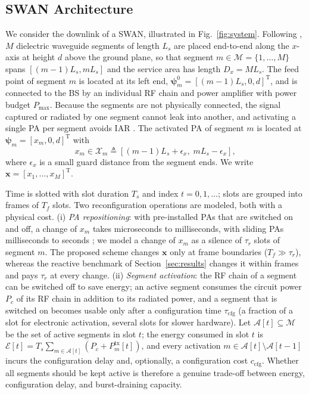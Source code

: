 \documentclass[journal]{IEEEtran}
\newcommand{\Pmax}{P_{\max}}
\newcommand{\vect}[1]{\bm{#1}}
\newcommand{\Mset}{\mathcal{M}}
\begin{document}
\subsection{SWAN Architecture}
We consider the downlink of a SWAN, illustrated in Fig.~\ref{fig:system}. Following \cite{Ouyang2026SWAN}, $M$ dielectric waveguide segments of length $L_s$ are placed end-to-end along the $x$-axis at height $d$ above the ground plane, so that segment $m\in\Mset=\{1,\dots,M\}$ spans $[(m-1)L_s, mL_s]$ and the service area has length $D_x=ML_s$. The feed point of segment $m$ is located at its left end, $\vect{\psi}_m^0=[(m-1)L_s,0,d]^{\mathrm T}$, and is connected to the BS by an individual RF chain and power amplifier with power budget $\Pmax$. Because the segments are not physically connected, the signal captured or radiated by one segment cannot leak into another, and activating a single PA per segment avoids IAR \cite{Ouyang2026SWAN}. The activated PA of segment $m$ is located at $\vect{\psi}_m=[x_m,0,d]^{\mathrm T}$ with
\begin{equation}
x_m\in\mathcal X_m\triangleq[(m-1)L_s+\epsilon_x,\; mL_s-\epsilon_x],
\end{equation}
where $\epsilon_x$ is a small guard distance from the segment ends. We write $\vect{x}=[x_1,\dots,x_M]^{\mathrm T}$.

Time is slotted with slot duration $T_s$ and index $t=0,1,\dots$; slots are grouped into frames of $T_f$ slots. Two reconfiguration operations are modeled, both with a physical cost. (i) \emph{PA repositioning}: with pre-installed PAs that are switched on and off, a change of $x_m$ takes microseconds to milliseconds, with sliding PAs milliseconds to seconds \cite{Liu2026PASSTutorial,Wang2026Roaming,Jiang2026DiscreteCoupling}; we model a change of $x_m$ as a silence of $\tau_r$ slots of segment $m$. The proposed scheme changes $\vect x$ only at frame boundaries ($T_f\gg\tau_r$), whereas the reactive benchmark of Section~\ref{sec:results} changes it within frames and pays $\tau_r$ at every change. (ii) \emph{Segment activation}: the RF chain of a segment can be switched off to save energy; an active segment consumes the circuit power $P_c$ of its RF chain in addition to its radiated power, and a segment that is switched on becomes usable only after a configuration time $\tau_{\mathrm{cfg}}$ (a fraction of a slot for electronic activation, several slots for slower hardware). Let $\mathcal A[t]\subseteq\Mset$ be the set of active segments in slot $t$; the energy consumed in slot $t$ is $\mathcal E[t]=T_s\sum_{m\in\mathcal A[t]}(P_c+P_m^{\mathrm{tx}}[t])$, and every activation $m\in\mathcal A[t]\setminus\mathcal A[t-1]$ incurs the configuration delay and, optionally, a configuration cost $c_{\mathrm{cfg}}$. Whether all segments should be kept active is therefore a genuine trade-off between energy, configuration delay, and burst-draining capacity.
\end{document}
